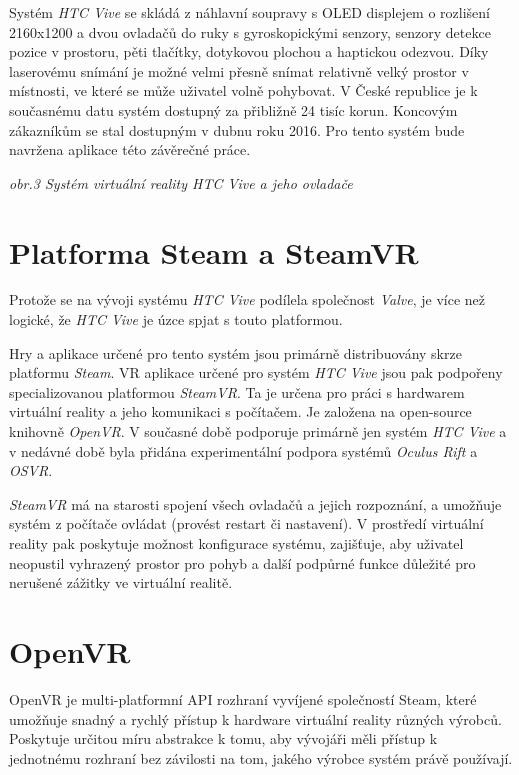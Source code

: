 Systém \emph{HTC Vive} se skládá z náhlavní soupravy s OLED displejem o
rozlišení 2160x1200 a dvou ovladačů do ruky s gyroskopickými senzory,
senzory detekce pozice v prostoru, pěti tlačítky, dotykovou plochou a
haptickou odezvou. Díky laserovému snímání je možné velmi přesně snímat
relativně velký prostor v místnosti, ve které se může uživatel volně
pohybovat. V České republice je k současnému datu systém dostupný za
přibližně 24 tisíc korun. Koncovým zákazníkům se stal dostupným v dubnu
roku 2016. Pro tento systém bude navržena aplikace této závěrečné práce.

\emph{obr.3 Systém virtuální reality HTC Vive a jeho ovladače}

\section{Platforma Steam a SteamVR}\label{platforma-steam-a-steamvr}

Protože se na vývoji systému \emph{HTC Vive} podílela společnost
\emph{Valve}, je více než logické, že \emph{HTC Vive} je úzce spjat s
touto platformou.

Hry a aplikace určené pro tento systém jsou primárně distribuovány skrze
platformu \emph{Steam}. VR aplikace určené pro systém \emph{HTC Vive}
jsou pak podpořeny specializovanou platformou \emph{SteamVR}. Ta je
určena pro práci s hardwarem virtuální reality a jeho komunikaci s
počítačem. Je založena na open-source knihovně \emph{OpenVR}. V současné
době podporuje primárně jen systém \emph{HTC Vive} a v nedávné době byla
přidána experimentální podpora systémů \emph{Oculus Rift} a \emph{OSVR}.

\emph{SteamVR} má na starosti spojení všech ovladačů a jejich
rozpoznání, a umožňuje systém z počítače ovládat (provést restart či
nastavení). V prostředí virtuální reality pak poskytuje možnost
konfigurace systému, zajišťuje, aby uživatel neopustil vyhrazený prostor
pro pohyb a další podpůrné funkce důležité pro nerušené zážitky ve
virtuální realitě.

\section{OpenVR}\label{openvr}

OpenVR je multi-platformní API rozhraní vyvíjené společností Steam,
které umožňuje snadný a rychlý přístup k hardware virtuální reality
různých výrobců. Poskytuje určitou míru abstrakce k tomu, aby vývojáři
měli přístup k jednotnému rozhraní bez závilosti na tom, jakého výrobce
systém právě používají.

